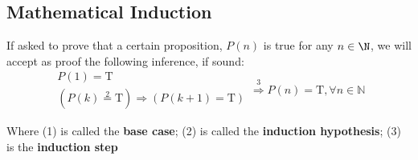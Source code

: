 \subsection{Mathematical Induction}
\begin{definition*}\label{def:mathematical-induction}
    If asked to prove that a certain proposition, $P(n)$ is true for any $n \in \N$, we will accept as proof the following inference, if sound:
    \begin{equation}
        \begin{array}{c}
            P(1) = \text{T} \tag{1} \\
            \left(P(k) \stackrel{2}{=} \text{T}\right) \Rightarrow \left(P(k+1) = \text{T}\right)
        \end{array}
        \stackrel{3}{\Rightarrow} P(n) = \text{T}, \forall n \in \mathbb{N}
    \end{equation}

    Where (1) is called the \textbf{base case}; (2) is called the \textbf{induction hypothesis}; (3) is the \textbf{induction step}
\end{definition*}
